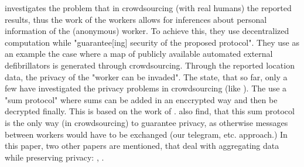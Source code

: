 \parencite{crowdsourcing} investigates the problem that in crowdsourcing (with real humans) the reported results, thus the work of the workers allows for inferences about personal information of the (anonymous) worker. To achieve this, they use decentralized computation while "guarantee[ing] security of the proposed protocol". They use as an example the case where a map of publicly available automated external defibrillators is generated through crowdsourcing. Through the reported location data, the privacy of the "worker can be invaded". The state, that so far, only a few have investigated the privacy problems in crowdsourcing (like \parencite{bernstein2011crowdsourcing}). The use a "sum protocol" where sums can be added in an enccrypted way and then be decrypted finally. This is based on the work of \parencite{encryption}. \parencite{lin2005privacy} also find, that this sum protocol is the only way (in crowdsourcing) to guarantee privacy, as otherwise messages between workers would have to be exchanged (our telegram, etc. approach.) In this paper, two other papers are mentioned, that deal with aggregating data while preserving privacy: \parencite{burkhart2010sepia}, \parencite{shamir1979share}. 

